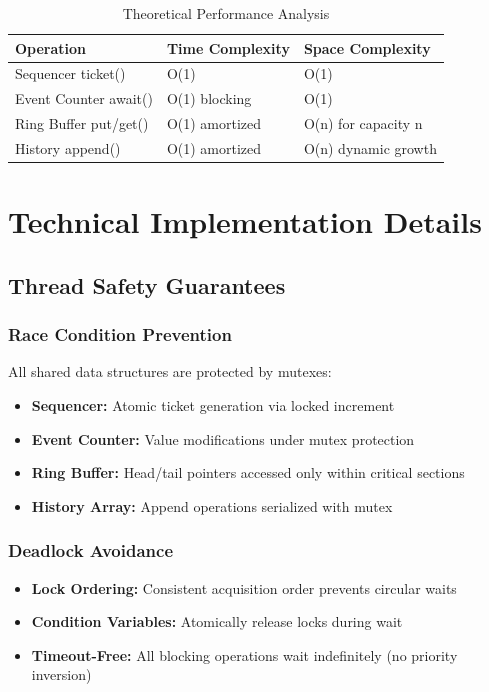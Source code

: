\documentclass[12pt,a4paper]{article}
\begin{document}
\begin{table}[H]
\centering
\caption{Theoretical Performance Analysis}
\begin{tabular}{@{}lll@{}}
\toprule
\textbf{Operation} & \textbf{Time Complexity} & \textbf{Space Complexity} \\ \midrule
Sequencer ticket() & O(1) & O(1) \\
Event Counter await() & O(1) blocking & O(1) \\
Ring Buffer put/get() & O(1) amortized & O(n) for capacity n \\
History append() & O(1) amortized & O(n) dynamic growth \\ \bottomrule
\end{tabular}
\end{table}

\clearpage

\section{Technical Implementation Details}

\subsection{Thread Safety Guarantees}

\subsubsection{Race Condition Prevention}
All shared data structures are protected by mutexes:
\begin{itemize}[leftmargin=*]
    \item \textbf{Sequencer:} Atomic ticket generation via locked increment
    \item \textbf{Event Counter:} Value modifications under mutex protection
    \item \textbf{Ring Buffer:} Head/tail pointers accessed only within critical sections
    \item \textbf{History Array:} Append operations serialized with mutex
\end{itemize}

\subsubsection{Deadlock Avoidance}
\begin{itemize}[leftmargin=*]
    \item \textbf{Lock Ordering:} Consistent acquisition order prevents circular waits
    \item \textbf{Condition Variables:} Atomically release locks during wait
    \item \textbf{Timeout-Free:} All blocking operations wait indefinitely (no priority inversion)
\end{itemize}
\end{document}
